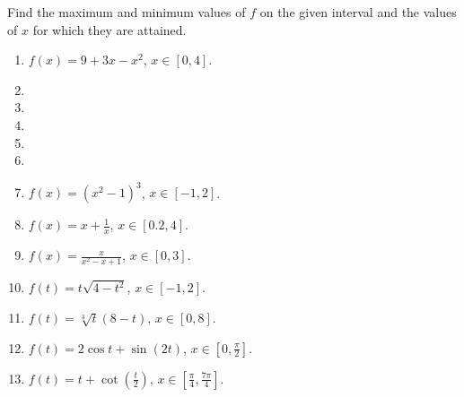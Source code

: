 Find the maximum and minimum values of $f$ on the given interval and the values of $x$ for which they are attained.
\begin{multicols}{2}
\begin{enumerate}[ref={\fcProblemRef}]
\item $\displaystyle f(x)=9+3x-x^2$, $x\in [0,4]$.

\item 
\item 
\item 
\item 
\item 
\item $\displaystyle f(x)=(x^2-1)^3$, $x\in [-1, 2]$.

\item $\displaystyle f(x)=x+\frac{1}{x}$, $x\in [0.2,4 ]$.

\item $\displaystyle f(x)=\frac{x}{x^2-x+1}$, $x\in [0,3 ]$.

\item $\displaystyle f(t)=t\sqrt{4-t^2}$, $x\in [-1,2 ]$.

\item $\displaystyle f(t)=\sqrt[3]{t}(8-t) $, $x\in [0,8 ]$.

\item $\displaystyle f(t)=2\cos t+\sin (2t)$, $x\in [0,\frac{\pi}{2} ]$.

\item $\displaystyle f(t)=t+\cot \left(\frac{t}{2}\right) $, $x\in [\frac{\pi}{4},\frac{7\pi}{4} ]$.



\end{enumerate}
\end{multicols}

